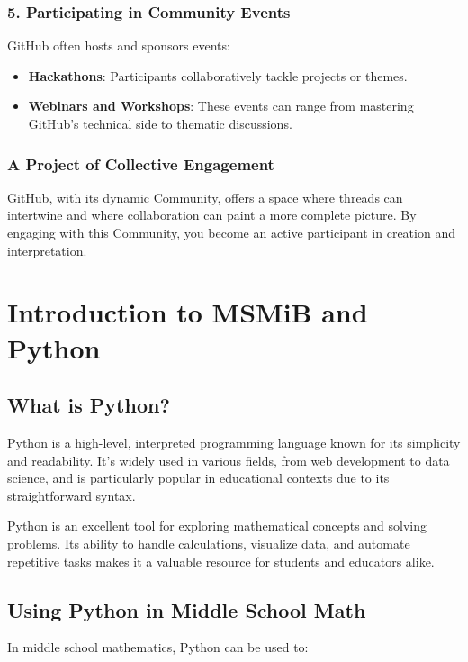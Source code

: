 \documentclass{book}
\begin{document}
\subsection*{5. Participating in Community Events}
GitHub often hosts and sponsors events:

\begin{itemize}
    \item \textbf{Hackathons}: Participants collaboratively tackle projects or themes.
    \item \textbf{Webinars and Workshops}: These events can range from mastering GitHub's technical side to thematic discussions.
\end{itemize}

\subsection*{A Project of Collective Engagement}
GitHub, with its dynamic Community, offers a space where threads can intertwine and where collaboration can paint a more complete picture. By engaging with this Community, you become an active participant in creation and interpretation.



\chapter{Introduction to MSMiB and Python}

\section{What is Python?}
Python is a high-level, interpreted programming language known for its simplicity and readability. It's widely used in various fields, from web development to data science, and is particularly popular in educational contexts due to its straightforward syntax.

Python is an excellent tool for exploring mathematical concepts and solving problems. Its ability to handle calculations, visualize data, and automate repetitive tasks makes it a valuable resource for students and educators alike.

\section{Using Python in Middle School Math}
In middle school mathematics, Python can be used to:
\end{document}
